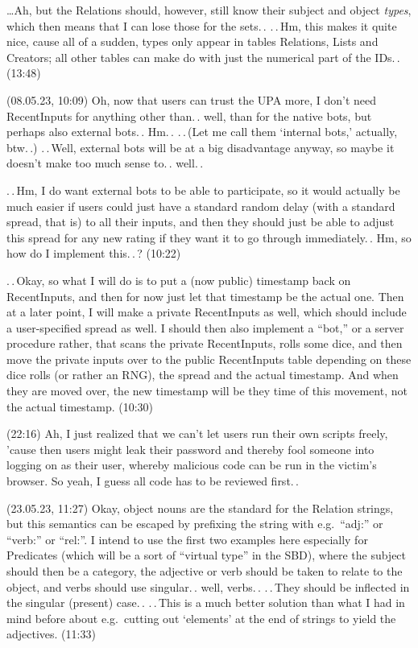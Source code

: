 \documentclass{report}
\begin{document}
\ldots Ah, but the Relations should, however, still know their subject and object \emph{types}, which then means that I can lose those for the sets.\,. .\,.\,Hm, this makes it quite nice, cause all of a sudden, types only appear in tables Relations, Lists and Creators; all other tables can make do with just the numerical part of the IDs.\,. (13:48)

(08.05.23, 10:09) Oh, now that users can trust the UPA more, I don't need RecentInputs for anything other than.\,. well, than for the native bots, but perhaps also external bots.\,. Hm.\,. .\,.\,(Let me call them `internal bots,' actually, btw.\,.) .\,.\,Well, external bots will be at a big disadvantage anyway, so maybe it doesn't make too much sense to.\,. well.\,.

.\,.\,Hm, I do want external bots to be able to participate, so it would actually be much easier if users could just have a standard random delay (with a standard spread, that is) to all their inputs, and then they should just be able to adjust this spread for any new rating if they want it to go through immediately.\,. Hm, so how do I implement this.\,.\,? (10:22)

.\,.\,Okay, so what I will do is to put a (now public) timestamp back on RecentInputs, and then for now just let that timestamp be the actual one. Then at a later point, I will make a private RecentInputs as well, which should include a user-specified spread as well. I should then also implement a ``bot,'' or a server procedure rather, that scans the private RecentInputs, rolls some dice, and then move the private inputs over to the public RecentInputs table depending on these dice rolls (or rather an RNG), the spread and the actual timestamp. And when they are moved over, the new timestamp will be they time of this movement, not the actual timestamp. (10:30)

(22:16) Ah, I just realized that we can't let users run their own scripts freely, 'cause then users might leak their password and thereby fool someone into logging on as their user, whereby malicious code can be run in the victim's browser. So yeah, I guess all code has to be reviewed first.\,. 


(23.05.23, 11:27) Okay, object nouns are the standard for the Relation strings, but this semantics can be escaped by prefixing the string with e.g.\ ``adj:'' or ``verb:'' or ``rel:''. I intend to use the first two examples here especially for Predicates (which will be a sort of ``virtual type'' in the SBD), where the subject should then be a category, the adjective or verb should be taken to relate to the object, and verbs should use singular.\,. well, verbs.\,. .\,.\,They should be inflected in the singular (present) case.\,. .\,.\,This is a much better solution than what I had in mind before about e.g.\ cutting out `elements' at the end of strings to yield the adjectives. (11:33)
\end{document}
